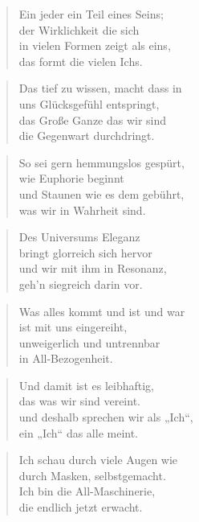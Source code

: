 \documentclass[10pt,a4paper]{article}
\begin{document}
\begin{paracol}{2}
\begin{verse}
Ein jeder ein Teil eines Seins; \\
der Wirklichkeit die sich \\
in vielen Formen zeigt als eins, \\
das formt die vielen Ichs. \\
\end{verse}

\begin{verse}
Das tief zu wissen, macht dass in \\
uns Glücksgefühl entspringt, \\
das Große Ganze das wir sind \\
die Gegenwart durchdringt. \\
\end{verse}

\begin{verse}
So sei gern hemmungslos gespürt, \\
wie Euphorie beginnt \\
und Staunen wie es dem gebührt, \\
was wir in Wahrheit sind. \\
\end{verse}

\begin{verse}
Des Universums Eleganz \\
bringt glorreich sich hervor \\
und wir mit ihm in Resonanz, \\
geh’n siegreich darin vor. \\
\end{verse}

\begin{verse}
Was alles kommt und ist und war \\
ist mit uns eingereiht, \\
unweigerlich und untrennbar \\
in All-Bezogenheit. \\
\end{verse}

\begin{verse}
Und damit ist es leibhaftig, \\
das was wir sind vereint. \\
und deshalb sprechen wir als „Ich“, \\
ein „Ich“ das alle meint. \\
\end{verse}

\begin{verse}
Ich schau durch viele Augen wie \\
durch Masken, selbstgemacht. \\
Ich bin die All-Maschinerie, \\
die endlich jetzt erwacht. \\
\end{verse}


\end{paracol}
\end{document}
